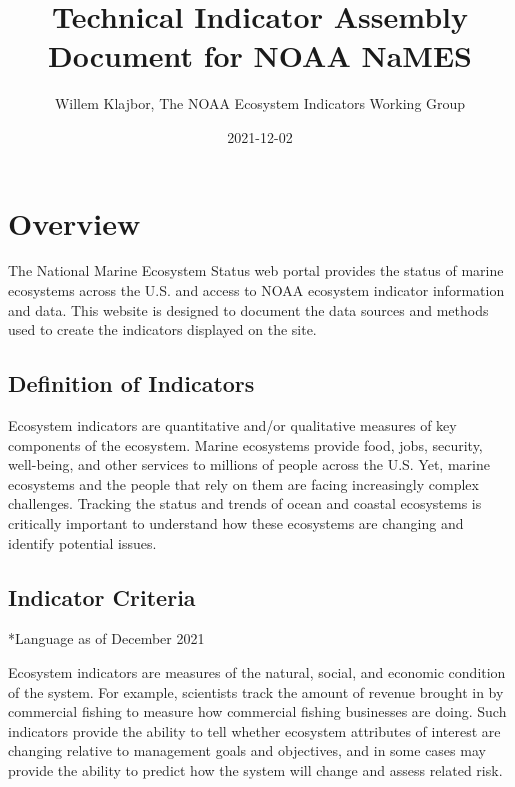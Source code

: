 \documentclass[
]{book}
\title{Technical Indicator Assembly Document for NOAA NaMES}
\author{Willem Klajbor, The NOAA Ecosystem Indicators Working Group}
\date{2021-12-02}
\begin{document}
\maketitle

{
\setcounter{tocdepth}{1}
\tableofcontents
}
\hypertarget{overview}{%
\chapter*{Overview}\label{overview}}

The National Marine Ecosystem Status web portal provides the status of marine ecosystems across the U.S. and access to NOAA ecosystem indicator information and data. This website is designed to document the data sources and methods used to create the indicators displayed on the site.

\hypertarget{definition-of-indicators}{%
\section{Definition of Indicators}\label{definition-of-indicators}}

Ecosystem indicators are quantitative and/or qualitative measures of key components of the ecosystem. Marine ecosystems provide food, jobs, security, well-being, and other services to millions of people across the U.S. Yet, marine ecosystems and the people that rely on them are facing increasingly complex challenges. Tracking the status and trends of ocean and coastal ecosystems is critically important to understand how these ecosystems are changing and identify potential issues.

\hypertarget{indicator-criteria}{%
\section{Indicator Criteria}\label{indicator-criteria}}

*Language as of December 2021

Ecosystem indicators are measures of the natural, social, and economic condition of the system. For example, scientists track the amount of revenue brought in by commercial fishing to measure how commercial fishing businesses are doing. Such indicators provide the ability to tell whether ecosystem attributes of interest are changing relative to management goals and objectives, and in some cases may provide the ability to predict how the system will change and assess related risk.
\end{document}
